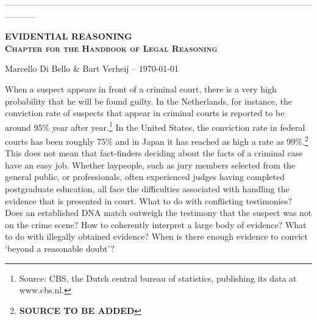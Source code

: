 \documentclass[10pt]{article}
\begin{document}
\thispagestyle{empty}

\vspace{-2cm}
\noindent
-----------------------------------------------------------------------------------------------------------------------


\vspace{5mm}
\noindent
\textsc{\large \bf  EVIDENTIAL REASONING \\ Chapter for the Handbook of Legal Reasoning}

\vspace{3mm}
\noindent
Marcello Di Bello \& Bart Verheij --  \today \\
\vspace{1cm}

\vspace{1cm}



\vspace{1cm}



\tableofcontents

\newpage

\noindent When a suspect appears in front of a criminal court, there is a very high probability that he will be found guilty. In the Netherlands, for instance, the conviction rate of suspects that appear in criminal courts is reported to be around 95\% year after year.\footnote{Source: CBS, the Dutch central bureau of statistics, publishing its data at www.cbs.nl.} In the United States, the conviction rate in federal courts has been roughly 75\% and in Japan it has reached as high a rate as 99\%.\footnote{\textbf{SOURCE TO BE ADDED}} This does not mean that fact-finders deciding about the facts of a criminal case have an easy job. Whether laypeople, such as jury members selected from the general public, or professionals, often experienced judges having completed postgraduate education, all face the difficulties associated with handling the evidence that is presented in court. What to do with conflicting testimonies? Does an established DNA match outweigh the testimony that the suspect was not on the crime scene? How to coherently interpret a large body of evidence? What to do with illegally obtained evidence? When is there enough evidence to convict `beyond a reasonable doubt'? 
\end{document}
